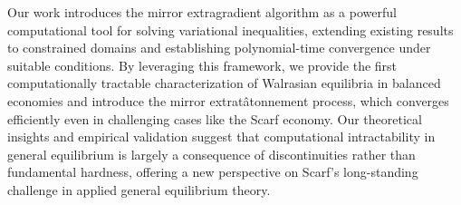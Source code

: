 Our work introduces the mirror extragradient algorithm as a powerful computational tool for solving variational inequalities, extending existing results to constrained domains and establishing polynomial-time convergence under suitable conditions. By leveraging this framework, we provide the first computationally tractable characterization of Walrasian equilibria in balanced economies and introduce the mirror extratâtonnement process, which converges efficiently even in challenging cases like the Scarf economy. Our theoretical insights and empirical validation suggest that computational intractability in general equilibrium is largely a consequence of discontinuities rather than fundamental hardness, offering a new perspective on Scarf’s long-standing challenge in applied general equilibrium theory.